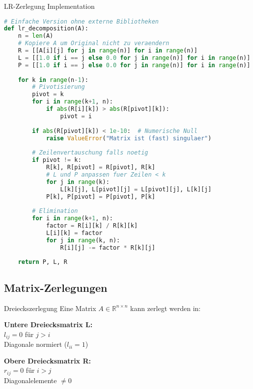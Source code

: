 \begin{examplecode}{LR-Zerlegung Implementation}
\begin{lstlisting}[language=Python, style=basesmol]
# Einfache Version ohne externe Bibliotheken
def lr_decomposition(A):
    n = len(A)
    # Kopiere A um Original nicht zu veraendern
    R = [[A[i][j] for j in range(n)] for i in range(n)]
    L = [[1.0 if i == j else 0.0 for j in range(n)] for i in range(n)]
    P = [[1.0 if i == j else 0.0 for j in range(n)] for i in range(n)]
    
    for k in range(n-1):
        # Pivotisierung
        pivot = k
        for i in range(k+1, n):
            if abs(R[i][k]) > abs(R[pivot][k]):
                pivot = i
        
        if abs(R[pivot][k]) < 1e-10:  # Numerische Null
            raise ValueError("Matrix ist (fast) singulaer")
            
        # Zeilenvertauschung falls noetig
        if pivot != k:
            R[k], R[pivot] = R[pivot], R[k]
            # L und P anpassen fuer Zeilen < k
            for j in range(k):
                L[k][j], L[pivot][j] = L[pivot][j], L[k][j]
            P[k], P[pivot] = P[pivot], P[k]
            
        # Elimination
        for i in range(k+1, n):
            factor = R[i][k] / R[k][k]
            L[i][k] = factor
            for j in range(k, n):
                R[i][j] -= factor * R[k][j]
               
    return P, L, R
\end{lstlisting}
\end{examplecode}

\subsection{Matrix-Zerlegungen}

\begin{definition}{Dreieckszerlegung}
Eine Matrix $A \in \mathbb{R}^{n\times n}$ kann zerlegt werden in:
\vspace{1mm}\\
\begin{minipage}[t]{0.5\textwidth}
    \textbf{Untere Dreiecksmatrix L:}\\
    $l_{ij} = 0$ für $j > i$\\
    Diagonale normiert ($l_{ii}=1$)
\end{minipage}
\hspace{3mm}
\begin{minipage}[t]{0.45\textwidth}
    \textbf{Obere Dreiecksmatrix R:}\\
    $r_{ij} = 0$ für $i > j$\\
    Diagonalelemente $\neq 0$
\end{minipage}
\end{definition}


